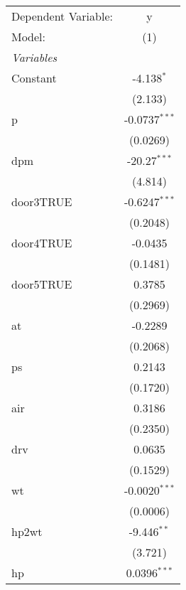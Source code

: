 
\begingroup
\centering
\begin{tabular}{lc}
   \tabularnewline \midrule \midrule
   Dependent Variable:            & y\\  
   Model:                         & (1)\\  
   \midrule
   \emph{Variables}\\
   Constant                       & -4.138$^{*}$\\   
                                  & (2.133)\\   
   p                              & -0.0737$^{***}$\\   
                                  & (0.0269)\\   
   dpm                            & -20.27$^{***}$\\   
                                  & (4.814)\\   
   door3TRUE                      & -0.6247$^{***}$\\   
                                  & (0.2048)\\   
   door4TRUE                      & -0.0435\\   
                                  & (0.1481)\\   
   door5TRUE                      & 0.3785\\   
                                  & (0.2969)\\   
   at                             & -0.2289\\   
                                  & (0.2068)\\   
   ps                             & 0.2143\\   
                                  & (0.1720)\\   
   air                            & 0.3186\\   
                                  & (0.2350)\\   
   drv                            & 0.0635\\   
                                  & (0.1529)\\   
   wt                             & -0.0020$^{***}$\\   
                                  & (0.0006)\\   
   hp2wt                          & -9.446$^{**}$\\   
                                  & (3.721)\\   
   hp                             & 0.0396$^{***}$\\   

\end{tabular}
